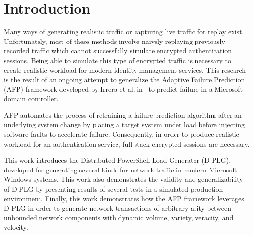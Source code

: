 \section{Introduction}
Many ways of generating realistic traffic or capturing live traffic for replay
exist.  Unfortunately, most of these methods involve naively replaying
previously recorded traffic which cannot successfully simulate encrypted
authentication sessions.  Being able to simulate this type of encrypted traffic
is necessary to create realistic workload for modern identity management
services.  This research is the result of an ongoing attempt to generalize the
Adaptive Failure Prediction (AFP) framework developed by Irrera et al.
in~\cite{irrera2015} to predict failure in a Microsoft domain controller.

AFP automates the process of retraining a failure prediction algorithm after an
underlying system change by placing a target system under load before injecting
software faults to accelerate failure.  Consequently, in order to produce
realistic workload for an authentication service, full-stack encrypted sessions
are necessary. 

This work introduces the Distributed PowerShell Load Generator (D-PLG),
developed for generating several kinds for network traffic in modern Microsoft
Windows systems.  This work also demonstrates the validity and generalizability
of D-PLG by presenting results of several tests in a simulated production
environment.  Finally, this work demonstrates how the AFP framework leverages
D-PLG in order to generate network transactions of arbitrary arity between
unbounded network components with dynamic volume, variety, veracity, and
velocity.
